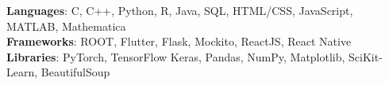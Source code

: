    \begin{itemize}[leftmargin=0.15in, label={}] 
    \small{\item{
      \textbf{Languages}: C, C++, Python, R, Java, SQL, HTML/CSS, JavaScript, MATLAB, Mathematica\\
      \textbf{Frameworks}: ROOT, Flutter, Flask, Mockito, ReactJS, React Native\\
      \textbf{Libraries}: PyTorch, TensorFlow Keras, Pandas, NumPy, Matplotlib, SciKit-Learn, BeautifulSoup
       }}
\end{itemize}